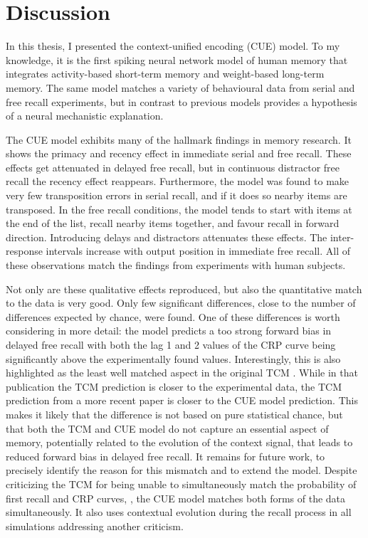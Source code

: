 \chapter{Discussion}
In this thesis, I presented the context-unified encoding (CUE) model.
To my knowledge, it is the first spiking neural network model of human memory that integrates activity-based short-term memory and weight-based long-term memory.
The same model matches a variety of behavioural data from serial and free recall experiments, but in contrast to previous models provides a hypothesis of a neural mechanistic explanation.

The CUE model exhibits many of the hallmark findings in memory research.
It shows the primacy and recency effect in immediate serial and free recall.
These effects get attenuated in delayed free recall, but in continuous distractor free recall the recency effect reappears.
Furthermore, the model was found to make very few transposition errors in serial recall, and if it does so nearby items are transposed.
In the free recall conditions, the model tends to start with items at the end of the list, recall nearby items together, and favour recall in forward direction.
Introducing delays and distractors attenuates these effects.
The inter-response intervals increase with output position in immediate free recall.
All of these observations match the findings from experiments with human subjects.

Not only are these qualitative effects reproduced, but also the quantitative match to the data is very good.
Only few significant differences, close to the number of differences expected by chance, were found.
One of these differences is worth considering in more detail: the model predicts a too strong forward bias in delayed free recall with both the lag \num{1} and \num{2} values of the CRP curve being significantly above the experimentally found values.
Interestingly, this is also highlighted as the least well matched aspect in the original TCM \parencite{Howard2002}.
While in that publication the TCM prediction is closer to the experimental data, the TCM prediction from a more recent paper \parencite{Sederberg2008} is closer to the CUE model prediction.
This makes it likely that the difference is not based on pure statistical chance, but that both the TCM and CUE model do not capture an essential aspect of memory, potentially related to the evolution of the context signal, that leads to reduced forward bias in delayed free recall.
It remains for future work, to precisely identify the reason for this mismatch and to extend the model.
Despite \textcite{farrell2008-1} criticizing the TCM for being unable to simultaneously match the probability of first recall and CRP curves, \parencite[but see][]{howard2009}, the CUE model matches both forms of the data simultaneously.
It also uses contextual evolution during the recall process in all simulations addressing another criticism.

